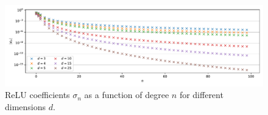 \begin{figure}[t]
    \centering
    \includegraphics[width=\linewidth]{Appendix2/coefficients_relu.pdf}
    \caption{ReLU coefficients $\sigma_n$ as a function of degree $n$ for different dimensions $d$.}
    \label{fig:relu-coef}
\end{figure}

